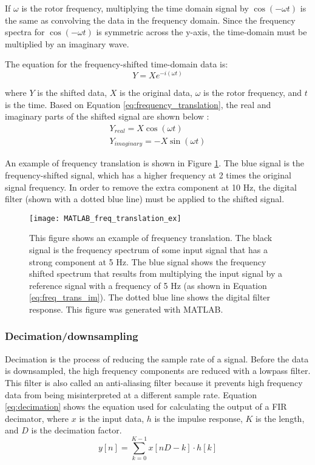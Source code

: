 If $\omega$ is the rotor frequency, multiplying the time domain signal by $\cos{(-\omega t)}$ is the same as convolving the data in the frequency domain.  Since the frequency spectra for $\cos{(-\omega t)}$ is symmetric across the y-axis, the time-domain must be multiplied by an imaginary wave.

The equation for the frequency-shifted time-domain data is:
\begin{equation} \label{eq:frequency_translation}
	Y = X e^{-i (\omega t)}
\end{equation}

where $Y$ is the shifted data, $X$ is the original data, $\omega$ is the rotor frequency, and $t$ is the time.  Based on Equation \ref{eq:frequency_translation}, the real and imaginary parts of the shifted signal are shown below \cite{zoom_fft_ref}:
\begin{align}
	Y_{real} = X \cos{(\omega t)} \\
	Y_{imaginary} = -X \sin{(\omega t)} \label{eq:freq_trans_im}
\end{align}

An example of frequency translation is shown in Figure \ref{fig:MATLAB_freq_translation_ex}.  The blue signal is the frequency-shifted signal, which has a higher frequency at 2 times the original signal frequency.  In order to remove the extra component at 10 Hz, the digital filter (shown with a dotted blue line) must be applied to the shifted signal.

\begin{figure}
	\centering
	\texttt{[image: MATLAB\_freq\_translation\_ex]}
	\decoRule
	\caption{This figure shows an example of frequency translation.  The black signal is the frequency spectrum of some input signal that has a strong component at 5 Hz.  The blue signal shows the frequency shifted spectrum that results from multiplying the input signal by a reference signal with a frequency of 5 Hz (as shown in Equation \ref{eq:freq_trans_im}).  The dotted blue line shows the digital filter response.  This figure was generated with MATLAB.}
	\label{fig:MATLAB_freq_translation_ex}
\end{figure}

\subsubsection{Decimation/downsampling}
Decimation is the process of reducing the sample rate of a signal.  Before the data is downsampled, the high frequency components are reduced with a lowpass filter. This filter is also called an anti-aliasing filter because it prevents high frequency data from being misinterpreted at a different sample rate.  Equation \ref{eq:decimation} shows the equation used for calculating the output of a FIR decimator, where $x$ is the input data, $h$ is the impulse response, $K$ is the length, and $D$ is the decimation factor\cite{decimation_ref}.
\begin{equation} \label{eq:decimation}
	y[n] = \sum_{k=0}^{K-1} x[nD-k] \cdot h[k]
\end{equation}

